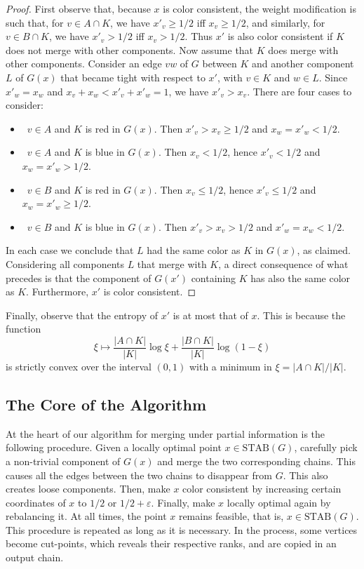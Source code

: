\documentclass{article} \usepackage{fullpage}
\newcommand{\STAB}{\mathrm{STAB}}
\begin{document}
\begin{proof}
First observe that, because $x$ is color consistent, the weight modification is such that, for $v \in A \cap K$, we have $x'_{v} \geq 1/2$ iff $x_{v} \geq 1/2$, and similarly, for $v \in B \cap K$, we have $x'_{v} > 1/2$ iff $x_{v} > 1/2$. Thus $x'$ is also color consistent if $K$ does not merge with other components.
Now assume that $K$ does merge with other components.
Consider an edge $vw$ of $G$ between $K$ and another component $L$ of $G(x)$ that became tight with respect to $x'$, with $v \in K$ and $w\in L$. Since $x'_{w} = x_{w}$ and $x_{v} + x_{w} < x'_{v} + x'_{w} = 1$, we have $x'_{v} > x_{v}$. There are four cases to consider:
\begin{itemize}
\item\ $v \in A$ and $K$ is red in $G(x)$. Then $x'_{v} > x_{v} \geq 1/2$ and $x_{w} = x'_{w} < 1/2$. 
\item\ $v \in A$ and $K$ is blue in $G(x)$. Then $x_{v} < 1/2$, hence $x'_{v} < 1/2$ and $x_{w} = x'_{w} > 1/2$. 
\item\ $v \in B$ and $K$ is red in $G(x)$. Then $x_{v} \leq 1/2$, hence $x'_{v} \leq 1/2$ and $x_{w} = x'_{w} \geq 1/2$. 
\item\ $v \in B$ and $K$ is blue in $G(x)$. Then $x'_{v} > x_{v} > 1/2$ and $x'_{w} = x_{w} < 1/2$.  
\end{itemize}
In each case we conclude that $L$ had the same color as $K$ in $G(x)$, as claimed. Considering all components $L$ that merge with $K$, a direct consequence of what precedes is that the component of $G(x')$ containing $K$ has also the same color as $K$. Furthermore, $x'$ is color consistent.
\end{proof}

Finally, observe that the entropy of $x'$ is at most that of $x$. This is because the function
$$
\xi \mapsto \frac{|A \cap K|}{|K|} \log \xi +
\frac{|B \cap K|}{|K|} \log (1-\xi)
$$
is strictly convex over the interval $(0,1)$ with a minimum in $\xi = |A \cap K| / |K|$.

\subsection{The Core of the Algorithm}
\label{sec:MUPI_core}

At the heart of our algorithm for merging under partial information is the following procedure. Given a locally optimal point $x \in \STAB(G)$, carefully pick a non-trivial component of $G(x)$ and merge the two corresponding chains. This causes all the edges between the two chains to disappear from $G$. This also creates loose components. Then, make $x$ color consistent by increasing certain coordinates of $x$ to $1/2$ or $1/2+\varepsilon$. Finally, make $x$ locally optimal again by rebalancing it. At all times, the point $x$ remains feasible, that is, $x\in \STAB(G)$. This procedure is repeated as long as it is necessary. In the process, some vertices become cut-points, which reveals their respective ranks, and are copied in an output chain.
\end{document}
